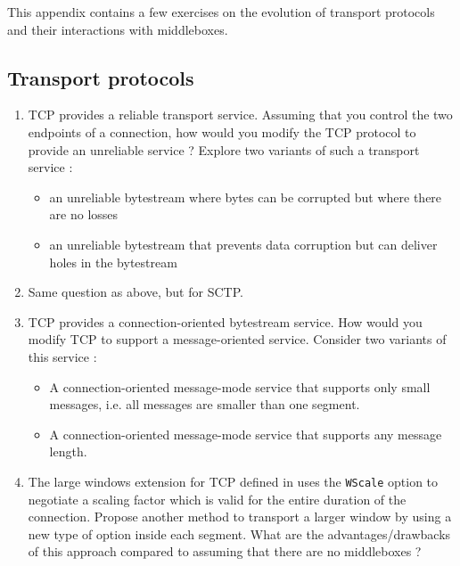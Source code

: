 This appendix contains a few exercises on the evolution of transport protocols and their interactions with middleboxes.

\subsection{Transport protocols}

\begin{enumerate}

\item TCP provides a reliable transport service. Assuming that you control the two endpoints of a connection, how would you modify the TCP protocol to provide an unreliable service ? Explore two variants of such a transport service :
  \begin{itemize}
  \item an unreliable bytestream where bytes can be corrupted but where there are no losses
  \item an unreliable bytestream that prevents data corruption but can deliver holes in the bytestream
  \end{itemize}

\item Same question as above, but for SCTP.

\item TCP provides a connection-oriented bytestream service. How would you modify TCP to support a message-oriented service. Consider two variants of this service :
 \begin{itemize}
    \item A connection-oriented message-mode service that supports only small messages, i.e. all messages are smaller than one segment.
    \item A connection-oriented message-mode service that supports any message length. 
 \end{itemize}

\item The large windows extension for TCP defined in \cite{rfc1323} uses the \texttt{WScale} option to negotiate a scaling factor which is valid for the entire duration of the connection. Propose another method to transport a larger window by using a new type of option inside each segment. What are the advantages/drawbacks of this approach compared to \cite{rfc1323} assuming that there are no middleboxes ?


\end{enumerate}
